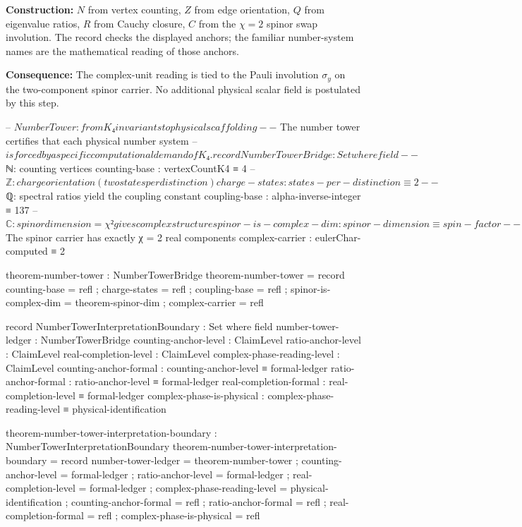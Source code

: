 \documentclass[11pt,a4paper]{book}
\def\mathbb#1{#1}%
\begin{document}
\textbf{Construction:} $\mathbb{N}$ from vertex counting, $\mathbb{Z}$ from edge orientation, $\mathbb{Q}$ from eigenvalue ratios, $\mathbb{R}$ from Cauchy closure, $\mathbb{C}$ from the $\chi = 2$ spinor swap involution. The record checks the displayed anchors; the familiar number-system names are the mathematical reading of those anchors.

\textbf{Consequence:} The complex-unit reading is tied to the Pauli involution $\sigma_y$ on the two-component spinor carrier. No additional physical scalar field is postulated by this step.

\begin{code}
-- $ Number Tower: from K₄ invariants to physical scaffolding

-- $ The number tower certifies that each physical number system
-- $ is forced by a specific computational demand of K₄.
record NumberTowerBridge : Set where
  field
    -- $ ℕ: counting vertices
    counting-base         : vertexCountK4 ≡ 4
    -- $ ℤ: charge orientation (two states per distinction)
    charge-states         : states-per-distinction ≡ 2
    -- $ ℚ: spectral ratios yield the coupling constant
    coupling-base         : alpha-inverse-integer ≡ 137
    -- $ ℂ: spinor dimension = χ² gives complex structure
    spinor-is-complex-dim : spinor-dimension ≡ spin-factor
    -- $ The spinor carrier has exactly χ = 2 real components
    complex-carrier       : eulerChar-computed ≡ 2

theorem-number-tower : NumberTowerBridge
theorem-number-tower = record
  { counting-base         = refl
  ; charge-states         = refl
  ; coupling-base         = refl
  ; spinor-is-complex-dim = theorem-spinor-dim
  ; complex-carrier       = refl }

record NumberTowerInterpretationBoundary : Set where
  field
    number-tower-ledger       : NumberTowerBridge
    counting-anchor-level     : ClaimLevel
    ratio-anchor-level        : ClaimLevel
    real-completion-level     : ClaimLevel
    complex-phase-reading-level : ClaimLevel
    counting-anchor-formal    : counting-anchor-level ≡ formal-ledger
    ratio-anchor-formal       : ratio-anchor-level ≡ formal-ledger
    real-completion-formal    : real-completion-level ≡ formal-ledger
    complex-phase-is-physical : complex-phase-reading-level ≡ physical-identification

theorem-number-tower-interpretation-boundary : NumberTowerInterpretationBoundary
theorem-number-tower-interpretation-boundary = record
  { number-tower-ledger       = theorem-number-tower
  ; counting-anchor-level     = formal-ledger
  ; ratio-anchor-level        = formal-ledger
  ; real-completion-level     = formal-ledger
  ; complex-phase-reading-level = physical-identification
  ; counting-anchor-formal    = refl
  ; ratio-anchor-formal       = refl
  ; real-completion-formal    = refl
  ; complex-phase-is-physical = refl }
\end{code}
\end{document}
